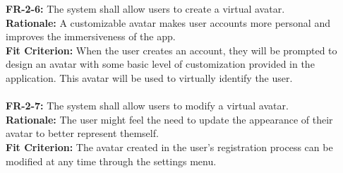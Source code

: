 \documentclass[12pt]{article}
\begin{document}
     \textbf{FR-2-6:} The system shall allow users to create a virtual avatar.\\
    \textbf{Rationale:} A customizable avatar makes user accounts more personal and improves the immersiveness of the app. \\
    \textbf{Fit Criterion:} When the user creates an account, they will be prompted to design an avatar with some basic level of customization provided in the application. This avatar will be used to virtually identify the user.\\\\
    \textbf{FR-2-7:} The system shall allow users to modify a virtual avatar.\\
    \textbf{Rationale:} The user might feel the need to update the appearance of their avatar to better represent themself. \\
    \textbf{Fit Criterion:} The avatar created in the user's registration process can be modified at any time through the settings menu.\\\\
\end{document}

